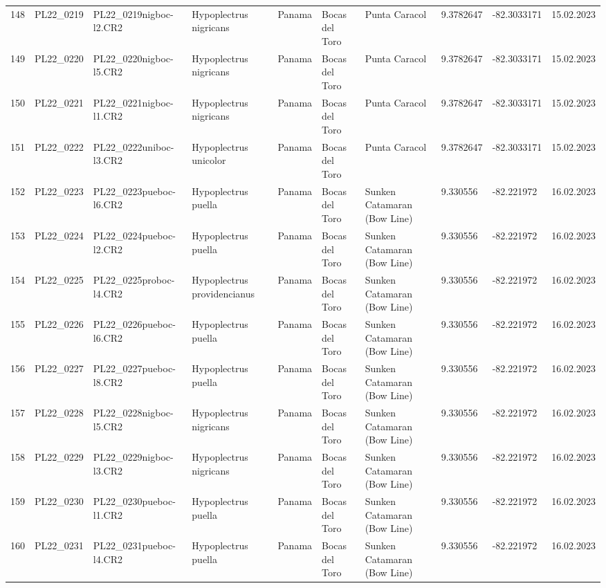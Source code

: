 \begin{table}[ht]
\begin{tabular}{rlllllllll}
  148 & PL22\_0219 & PL22\_0219nigboc-l2.CR2 & Hypoplectrus nigricans  & Panama & Bocas del Toro & Punta Caracol & 9.3782647 & -82.3033171 & 15.02.2023 \\ 
  149 & PL22\_0220 & PL22\_0220nigboc-l5.CR2 & Hypoplectrus nigricans  & Panama & Bocas del Toro & Punta Caracol & 9.3782647 & -82.3033171 & 15.02.2023 \\ 
  150 & PL22\_0221 & PL22\_0221nigboc-l1.CR2 & Hypoplectrus nigricans  & Panama & Bocas del Toro & Punta Caracol & 9.3782647 & -82.3033171 & 15.02.2023 \\ 
  151 & PL22\_0222 & PL22\_0222uniboc-l3.CR2 & Hypoplectrus unicolor & Panama & Bocas del Toro & Punta Caracol & 9.3782647 & -82.3033171 & 15.02.2023 \\ 
  152 & PL22\_0223 & PL22\_0223pueboc-l6.CR2 & Hypoplectrus puella & Panama & Bocas del Toro & Sunken Catamaran (Bow Line) & 9.330556 & -82.221972 & 16.02.2023 \\ 
  153 & PL22\_0224 & PL22\_0224pueboc-l2.CR2 & Hypoplectrus puella & Panama & Bocas del Toro & Sunken Catamaran (Bow Line) & 9.330556 & -82.221972 & 16.02.2023 \\ 
  154 & PL22\_0225 & PL22\_0225proboc-l4.CR2 & Hypoplectrus providencianus & Panama & Bocas del Toro & Sunken Catamaran (Bow Line) & 9.330556 & -82.221972 & 16.02.2023 \\ 
  155 & PL22\_0226 & PL22\_0226pueboc-l6.CR2 & Hypoplectrus puella & Panama & Bocas del Toro & Sunken Catamaran (Bow Line) & 9.330556 & -82.221972 & 16.02.2023 \\ 
  156 & PL22\_0227 & PL22\_0227pueboc-l8.CR2 & Hypoplectrus puella & Panama & Bocas del Toro & Sunken Catamaran (Bow Line) & 9.330556 & -82.221972 & 16.02.2023 \\ 
  157 & PL22\_0228 & PL22\_0228nigboc-l5.CR2 & Hypoplectrus nigricans  & Panama & Bocas del Toro & Sunken Catamaran (Bow Line) & 9.330556 & -82.221972 & 16.02.2023 \\ 
  158 & PL22\_0229 & PL22\_0229nigboc-l3.CR2 & Hypoplectrus nigricans  & Panama & Bocas del Toro & Sunken Catamaran (Bow Line) & 9.330556 & -82.221972 & 16.02.2023 \\ 
  159 & PL22\_0230 & PL22\_0230pueboc-l1.CR2 & Hypoplectrus puella & Panama & Bocas del Toro & Sunken Catamaran (Bow Line) & 9.330556 & -82.221972 & 16.02.2023 \\ 
  160 & PL22\_0231 & PL22\_0231pueboc-l4.CR2 & Hypoplectrus puella & Panama & Bocas del Toro & Sunken Catamaran (Bow Line) & 9.330556 & -82.221972 & 16.02.2023 \\ 

\end{tabular}
\end{table}
